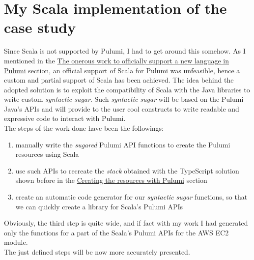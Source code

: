 \section{My Scala implementation of the case study}
Since Scala is not supported by Pulumi, I had to get around this somehow.
As I mentioned in the \hyperref[sssec:off-support-pulumi]{The onerous work to officially support a new language in Pulumi} section, an official support of Scala for Pulumi was unfeasible, hence a custom and partial support of Scala has been achieved.
The idea behind the adopted solution is to exploit the compatibility of Scala with the Java libraries to write custom \textit{syntactic sugar}.
Such \textit{syntactic sugar} will be based on the Pulumi Java's APIs and will provide to the user cool constructs to write readable and expressive code to interact with Pulumi.\\
The steps of the work done have been the followings:
\begin{enumerate}
  \item manually write the \textit{sugared} Pulumi API functions to create the Pulumi resources using Scala
  \item use such APIs to recreate the \textit{stack} obtained with the TypeScript solution shown before in the \hyperref[sec:ts-res-creation]{Creating the resources with Pulumi} section
  \item create an automatic code generator for our \textit{syntactic sugar} functions, so that we can quickly create a library for Scala's Pulumi APIs
\end{enumerate}
Obviously, the third step is quite wide, and if fact with my work I had generated only the functions for a part of the Scala's Pulumi APIs for the AWS EC2 module.\\
The just defined steps will be now more accurately presented.

